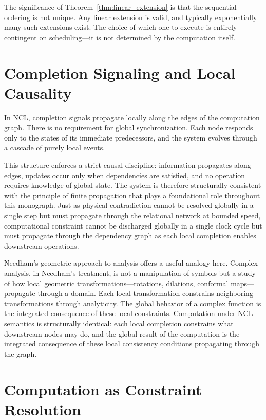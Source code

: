\documentclass[12pt,a4paper,openany]{book}
\theoremstyle{plain}
\theoremstyle{definition}
\theoremstyle{remark}
\begin{document}
The significance of Theorem~\ref{thm:linear_extension} is that the sequential ordering is not unique. Any linear extension is valid, and typically exponentially many such extensions exist. The choice of which one to execute is entirely contingent on scheduling---it is not determined by the computation itself.

\section{Completion Signaling and Local Causality}

In NCL, completion signals propagate locally along the edges of the computation graph. There is no requirement for global synchronization. Each node responds only to the states of its immediate predecessors, and the system evolves through a cascade of purely local events.

This structure enforces a strict causal discipline: information propagates along edges, updates occur only when dependencies are satisfied, and no operation requires knowledge of global state. The system is therefore structurally consistent with the principle of finite propagation that plays a foundational role throughout this monograph. Just as physical contradiction cannot be resolved globally in a single step but must propagate through the relational network at bounded speed, computational constraint cannot be discharged globally in a single clock cycle but must propagate through the dependency graph as each local completion enables downstream operations.

Needham's geometric approach to analysis \cite{Needham1997} offers a useful analogy here. Complex analysis, in Needham's treatment, is not a manipulation of symbols but a study of how local geometric transformations---rotations, dilations, conformal maps---propagate through a domain. Each local transformation constrains neighboring transformations through analyticity. The global behavior of a complex function is the integrated consequence of these local constraints. Computation under NCL semantics is structurally identical: each local completion constrains what downstream nodes may do, and the global result of the computation is the integrated consequence of these local consistency conditions propagating through the graph.

\section{Computation as Constraint Resolution}
\end{document}
